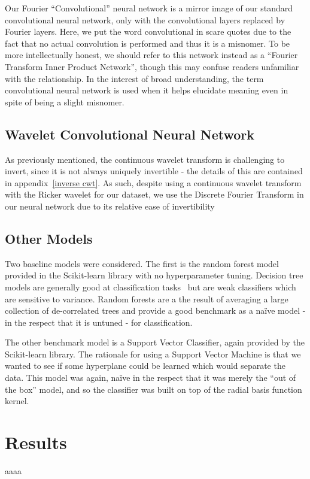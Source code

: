 \documentclass[10pt]{article}
\begin{document}
Our Fourier ``Convolutional'' neural network is a mirror image of our standard convolutional neural network, only with the convolutional layers replaced by Fourier layers.
Here, we put the word convolutional in scare quotes due to the fact that no actual convolution is performed and thus it is a misnomer.
To be more intellectually honest, we should refer to this network instead as a ``Fourier Transform Inner Product Network'', though this may confuse readers unfamiliar with the relationship.
In the interest of broad understanding, the term convolutional neural network is used when it helps elucidate meaning even in spite of being a slight misnomer.

\subsection{Wavelet Convolutional Neural Network} \label{wavelet cnn}
As previously mentioned, the continuous wavelet transform is challenging to invert, since it is not always uniquely invertible - the details of this are contained in appendix~\ref{inverse cwt}.
As such, despite using a continuous wavelet transform with the Ricker wavelet for our dataset, we use the Discrete Fourier Transform in our neural network due to its relative ease of invertibility

\subsection{Other Models} \label{other models}
Two baseline models were considered.
The first is the random forest model provided in the Scikit-learn library with no hyperparameter tuning.
Decision tree models are generally good at classification tasks~\cite{hastie01statisticallearning} but are weak classifiers which are sensitive to variance.
Random forests are a the result of averaging a large collection of de-correlated trees and provide a good benchmark as a na\"ive model - in the respect that it is untuned - for classification.

The other benchmark model is a Support Vector Classifier, again provided by the Scikit-learn library.
The rationale for using a Support Vector Machine is that we wanted to see if some hyperplane could be learned which would separate the data.
This model was again, na\"ive in the respect that it was merely the ``out of the box'' model, and so the classifier was built on top of the radial basis function kernel.

\section{Results}
aaaa
\end{document}

